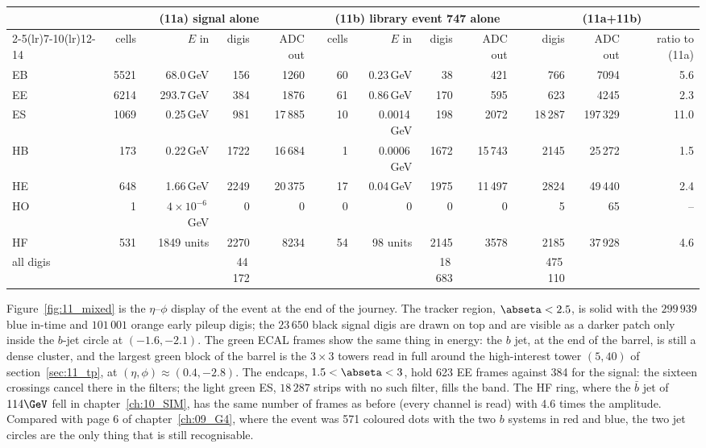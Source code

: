 \begin{table}[tb]
\medskip
\begin{tabular}{lrrrrcrrrrcrrr}
\toprule
 & \multicolumn{4}{c}{(11a) signal alone} & & \multicolumn{4}{c}{(11b) library event 747 alone} & & \multicolumn{3}{c}{(11a+11b)} \\
\cmidrule(lr){2-5}\cmidrule(lr){7-10}\cmidrule(lr){12-14}
 & cells & $E$ in & digis & ADC out & & cells & $E$ in & digis & ADC out & & digis & ADC out & ratio to (11a) \\
\midrule
EB & 5521 & 68.0\,GeV & 156 & 1260 & & 60 & 0.23\,GeV & 38 & 421 & & 766 & 7094 & 5.6 \\
EE & 6214 & 293.7\,GeV & 384 & 1876 & & 61 & 0.86\,GeV & 170 & 595 & & 623 & 4245 & 2.3 \\
ES & 1069 & 0.25\,GeV & 981 & 17\,885 & & 10 & 0.0014\,GeV & 198 & 2072 & & 18\,287 & 197\,329 & 11.0 \\
HB & 173 & 0.22\,GeV & 1722 & 16\,684 & & 1 & 0.0006\,GeV & 1672 & 15\,743 & & 2145 & 25\,272 & 1.5 \\
HE & 648 & 1.66\,GeV & 2249 & 20\,375 & & 17 & 0.04\,GeV & 1975 & 11\,497 & & 2824 & 49\,440 & 2.4 \\
HO & 1 & $4\times10^{-6}$\,GeV & 0 & 0 & & 0 & 0 & 0 & 0 & & 5 & 65 & -- \\
HF & 531 & 1849 units & 2270 & 8234 & & 54 & 98 units & 2145 & 3578 & & 2185 & 37\,928 & 4.6 \\
\midrule
all digis & & & 44\,172 & & & & & 18\,683 & & & 475\,110 & & \\
\bottomrule
\end{tabular}
\end{table}

Figure~\ref{fig:11_mixed} is the $\eta$--$\phi$ display of the event at the end of the journey. The tracker region,
$\abseta<2.5$, is solid with the $299\,939$ blue in-time and $101\,001$ orange early pileup digis; the $23\,650$ black
signal digis are drawn on top and are visible as a darker patch only inside the $b$-jet circle at $(-1.6,-2.1)$. The
green ECAL frames show the same thing in energy: the $b$ jet, at the end of the barrel, is still a dense cluster, and
the largest green block of the barrel is the $3\times3$ towers read in full around the high-interest tower $(5,40)$ of
section~\ref{sec:11_tp}, at $(\eta,\phi)\approx(0.4,-2.8)$. The endcaps, $1.5<\abseta<3$, hold 623 EE frames against
384 for the signal: the sixteen crossings cancel there in the filters; the light green ES, $18\,287$ strips with no
such filter, fills the band. The HF ring,
where the $\bar b$ jet of $114\GeV$ fell in chapter~\ref{ch:10_SIM}, has the same number of frames as before (every
channel is read) with 4.6 times the amplitude. Compared with page 6 of
chapter~\ref{ch:09_G4}, where the event was 571 coloured dots with the two $b$ systems in red and blue, the two
jet circles are the only thing that is still recognisable.

